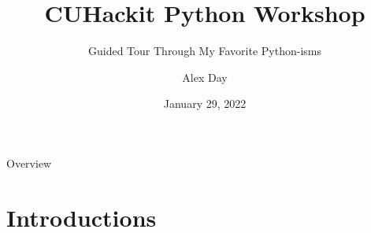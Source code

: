 \documentclass[aspectratio=169,xcolor=dvipsnames]{beamer}
\title[short title]{CUHackit Python Workshop} %
\subtitle{Guided Tour Through My Favorite Python-isms}
\author[Day]{Alex Day}
\institute[CU] %
{
  Ph.D. Student\\
  School of Computing\\
  \vspace{10px}
  \href{https://github.com/AlexanderDavid/CUHackit2022-PythonWorkshop}{shorturl.at/lrFH2}
}
\date{January 29, 2022} %
\begin{document}
\begin{frame}
    \titlepage
\end{frame}

\begin{frame}{Overview}
    \tableofcontents
\end{frame}

\section{Introductions}
\end{document}
